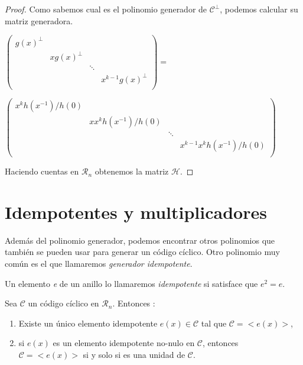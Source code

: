 \begin{proof}
Como sabemos cual es el polinomio generador de $\mathcal{C}^\perp$, podemos calcular su matriz generadora.

$\begin{pmatrix}
			g(x)^\perp &  &  &   \\
			 & xg(x)^\perp  &  &   \\
			 &  & \ddots &   \\
			 &  &  & x^{k-1}g(x)^\perp  \\
	\end{pmatrix} = $
	
	$\begin{pmatrix}
			x^kh(x^{-1})/h(0) &  &  &   \\
			 & xx^kh(x^{-1})/h(0)  &  &   \\
			 &  & \ddots &   \\
			 &  &  & x^{k-1}x^kh(x^{-1})/h(0)  \\
	\end{pmatrix}$ 
	
Haciendo cuentas en $\mathcal{R}_n$ obtenemos la matriz $\mathcal{H}$. 
\end{proof}


\section{Idempotentes y multiplicadores}

Además del polinomio generador, podemos encontrar otros polinomios que también se pueden usar para generar un código cíclico. Otro polinomio muy común es el que llamaremos \textit{generador idempotente}.

\begin{definition}
Un elemento \textit{e} de un anillo lo llamaremos \textit{idempotente} si satisface que $e^2=e$.
\end{definition}

\begin{theorem}
Sea $\mathcal{C}$ un código cíclico en $\mathcal{R}_n$. Entonces :
\begin{enumerate}
	\item Existe un único elemento idempotente $e(x) \in \mathcal{C}$ tal que $\mathcal{C} = < e(x) >$,
	\item si $e(x)$ es un elemento idempotente no-nulo en $\mathcal{C}$, entonces $\mathcal{C} = < e(x) >$ si y solo si es una unidad de $\mathcal{C}$.
\end{enumerate}
\end{theorem} 

